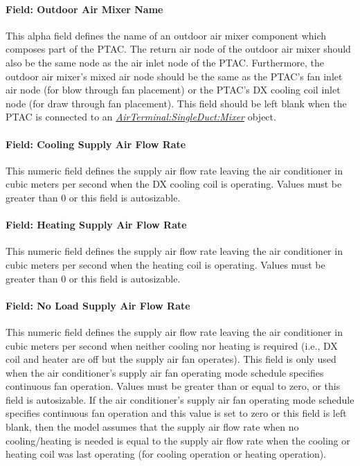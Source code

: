 \paragraph{Field: Outdoor Air Mixer Name}\label{field-outdoor-air-mixer-name-2}

This alpha field defines the name of an outdoor air mixer component which composes part of the PTAC. The return air node of the outdoor air mixer should also be the same node as the air inlet node of the PTAC. Furthermore, the outdoor air mixer's mixed air node should be the same as the PTAC's fan inlet air node (for blow through fan placement) or the PTAC's DX cooling coil inlet node (for draw through fan placement). This field should be left blank when the PTAC is connected to an \textit{\hyperref[airterminalsingleductmixer]{AirTerminal:SingleDuct:Mixer}} object.

\paragraph{Field: Cooling Supply Air Flow Rate}\label{field-cooling-supply-air-flow-rate-002}

This numeric field defines the supply air flow rate leaving the air conditioner in cubic meters per second when the DX cooling coil is operating. Values must be greater than 0 or this field is autosizable.

\paragraph{Field: Heating Supply Air Flow Rate}\label{field-heating-supply-air-flow-rate-002}

This numeric field defines the supply air flow rate leaving the air conditioner in cubic meters per second when the heating coil is operating. Values must be greater than 0 or this field is autosizable.

\paragraph{Field: No Load Supply Air Flow Rate}\label{field-no-load-supply-air-flow-rate-001}

This numeric field defines the supply air flow rate leaving the air conditioner in cubic meters per second when neither cooling nor heating is required (i.e., DX coil and heater are off but the supply air fan operates). This field is only used when the air conditioner's supply air fan operating mode schedule specifies continuous fan operation. Values must be greater than or equal to zero, or this field is autosizable. If the air conditioner's supply air fan operating mode schedule specifies continuous fan operation and this value is set to zero or this field is left blank, then the model assumes that the supply air flow rate when no cooling/heating is needed is equal to the supply air flow rate when the cooling or heating coil was last operating (for cooling operation or heating operation).

